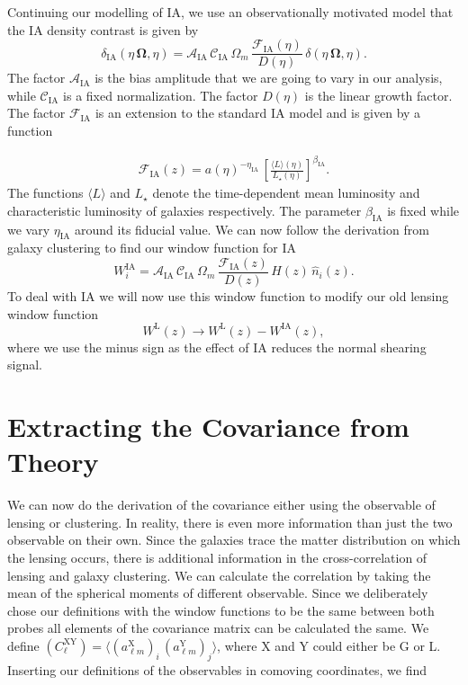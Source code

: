 \documentclass[oneside]{book}
\begin{document}
\newline
Continuing our modelling of IA, we use an observationally motivated model that the IA density contrast is given by 
\begin{equation}
    \delta_\mathrm{IA}(\eta\,\boldsymbol{\Omega},\eta) = \mathcal{A}_\mathrm{IA}\,\mathcal{C}_\mathrm{IA}\,\Omega_m\,\frac{\mathcal{F}_\mathrm{IA}(\eta)}{D(\eta)}\,\delta(\eta\, \boldsymbol{\Omega},\eta).
\end{equation}
The factor $\mathcal{A}_\mathrm{IA}$ is the bias amplitude that we are going to vary in our analysis, while $\mathcal{C}_\mathrm{IA}$ is a fixed normalization. The factor $D(\eta)$ is the linear growth factor. The factor $\mathcal{F}_\mathrm{IA}$ is an extension to the standard IA model and is given by a function 

\begin{align}
    \mathcal{F}_\mathrm{IA}(z) = a(\eta)^{-\eta_\mathrm{IA}}\,\left[\frac{\langle L \rangle(\eta)}{L_\star(\eta)}\right]^{\beta_\mathrm{IA}}.
\end{align}
The functions $\langle L \rangle$ and $L_\star$ denote the time-dependent mean luminosity and characteristic luminosity of galaxies respectively. The parameter $\beta_\mathrm{IA}$ is fixed while we vary $\eta_\mathrm{IA}$ around its fiducial value. We can now follow the derivation from galaxy clustering to find our window function for IA\begin{equation}
    W_i^\mathrm{IA} =  \mathcal{A}_\mathrm{IA}\,\mathcal{C}_\mathrm{IA}\,\Omega_m\,\frac{\mathcal{F}_\mathrm{IA}(z)}{D(z)}\,H(z)\,\hat{n}_i(z).
\end{equation}
To deal with IA we will now use this window function to modify our old lensing window function\begin{equation}
    W^\mathrm{L}(z) \to W^\mathrm{L}(z) - W^\mathrm{IA}(z),
\end{equation}
where we use the minus sign as the effect of IA reduces the normal shearing signal.
\section{Extracting the Covariance from Theory}
We can now do the derivation of the covariance either using the observable of lensing or clustering. In reality, there is even more information than just the two observable on their own. Since the galaxies trace the matter distribution on which the lensing occurs, there is additional information in the cross-correlation of lensing and galaxy clustering. We can calculate the correlation by taking the mean of the spherical moments of different observable. Since we deliberately chose our definitions with the window functions to be the same between both probes all elements of the covariance matrix can be calculated the same. We define $\left(C^\mathrm{XY}_{\ell}\right)=\langle \left(a^\mathrm{X}_{\ell m}\right)_i \, \left(a^\mathrm{Y}_{\ell m}\right)_j\rangle$, where X and Y could either be G or L. Inserting our definitions of the observables in comoving coordinates, we find 
\end{document}
